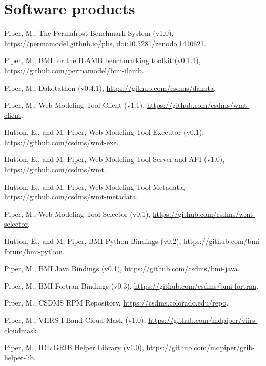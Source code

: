 \section{Software products}
\vspace{0.5em}

\begin{enumerate}[{[}1{]}]

  \item Piper, M., The Permafrost Benchmark System (v1.0),
    \url{https://permamodel.github.io/pbs},
    {doi:10.5281/zenodo.1410621}.

  \item Piper, M., BMI for the ILAMB benchmarking toolkit (v0.1.1),
    \url{https://github.com/permamodel/bmi-ilamb}.

  \item Piper, M., Dakotathon (v0.4.1),
    \url{https://github.com/csdms/dakota}.

  \item Piper, M., Web Modeling Tool Client (v1.1),
    \url{https://github.com/csdms/wmt-client}.

  \item Hutton, E., and M. Piper, Web Modeling Tool Executor (v0.1),
    \url{https://github.com/csdms/wmt-exe}.

  \item Hutton, E., and M. Piper, Web Modeling Tool Server and API (v1.0),
    \url{https://github.com/csdms/wmt}.

  \item Hutton, E., and M. Piper, Web Modeling Tool Metadata,
    \url{https://github.com/csdms/wmt-metadata}.

  \item Piper, M., Web Modeling Tool Selector (v0.1),
    \url{https://github.com/csdms/wmt-selector}.

  \item Hutton, E., and M. Piper, BMI Python Bindings (v0.2),
    \url{https://github.com/bmi-forum/bmi-python}.

  \item Piper, M., BMI Java Bindings (v0.1),
    \url{https://github.com/csdms/bmi-java}.

  \item Piper, M., BMI Fortran Bindings (v0.3),
    \url{https://github.com/csdms/bmi-fortran}.

  \item Piper, M., CSDMS RPM Repository,
    \url{https://csdms.colorado.edu/repo}.

  \item Piper, M., VIIRS I-Band Cloud Mask (v1.0),
    \url{https://github.com/mdpiper/viirs-cloudmask}.

  \item Piper, M., IDL GRIB Helper Library (v1.0),
    \url{https://github.com/mdpiper/grib-helper-lib}.

\end{enumerate}
